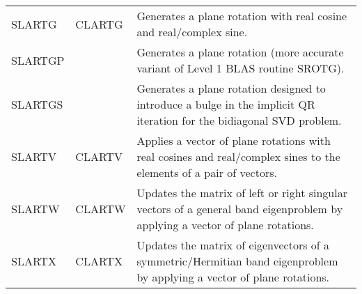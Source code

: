 \begin{center}
\begin{tabular}{| l   p{0.75in} |p{4.5in}    |}
SLARTG&CLARTG&
Generates a plane rotation with real cosine and real/complex sine.\\
SLARTGP&&
Generates a plane rotation (more accurate variant of Level 1 BLAS routine SROTG).\\
SLARTGS&&
Generates a plane rotation designed to introduce a bulge in the implicit QR iteration
for the bidiagonal SVD problem.\\
SLARTV&CLARTV& 
Applies a vector of plane rotations with real cosines and real/complex sines
to the elements of a pair of vectors.\\
SLARTW&CLARTW&
Updates the matrix of left or right singular vectors of a general band eigenproblem
by applying a vector of plane rotations.\\
SLARTX&CLARTX&
Updates the matrix of eigenvectors of a symmetric/Hermitian band eigenproblem 
by applying a vector of plane rotations.\\
\hline
\end{tabular}
\end{center}


